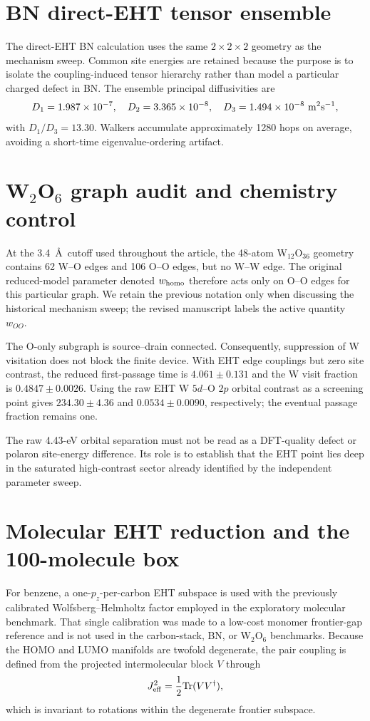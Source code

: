 \documentclass[aps,prmaterials,onecolumn,amsmath,amssymb,superscriptaddress]{revtex4-2}
\begin{document}
\section{BN direct-EHT tensor ensemble}
The direct-EHT BN calculation uses the same $2\times2\times2$ geometry as the mechanism sweep. Common site energies are retained because the purpose is to isolate the coupling-induced tensor hierarchy rather than model a particular charged defect in BN. The ensemble principal diffusivities are
\begin{equation}
D_1=1.987\times10^{-7},\quad D_2=3.365\times10^{-8},\quad D_3=1.494\times10^{-8}\ {\rm m^2s^{-1}},
\end{equation}
with $D_1/D_3=13.30$. Walkers accumulate approximately 1280 hops on average, avoiding a short-time eigenvalue-ordering artifact.

\section{W$_2$O$_6$ graph audit and chemistry control}
At the 3.4~\AA\ cutoff used throughout the article, the 48-atom W$_{12}$O$_{36}$ geometry contains 62 W--O edges and 106 O--O edges, but no W--W edge. The original reduced-model parameter denoted $w_{\rm homo}$ therefore acts only on O--O edges for this particular graph. We retain the previous notation only when discussing the historical mechanism sweep; the revised manuscript labels the active quantity $w_{OO}$.

The O-only subgraph is source--drain connected. Consequently, suppression of W visitation does not block the finite device. With EHT edge couplings but zero site contrast, the reduced first-passage time is $4.061\pm0.131$ and the W visit fraction is $0.4847\pm0.0026$. Using the raw EHT W $5d$--O $2p$ orbital contrast as a screening point gives $234.30\pm4.36$ and $0.0534\pm0.0090$, respectively; the eventual passage fraction remains one.

The raw 4.43-eV orbital separation must not be read as a DFT-quality defect or polaron site-energy difference. Its role is to establish that the EHT point lies deep in the saturated high-contrast sector already identified by the independent parameter sweep.

\section{Molecular EHT reduction and the 100-molecule box}
For benzene, a one-$p_z$-per-carbon EHT subspace is used with the previously calibrated Wolfsberg--Helmholtz factor employed in the exploratory molecular benchmark. That single calibration was made to a low-cost monomer frontier-gap reference and is not used in the carbon-stack, BN, or W$_2$O$_6$ benchmarks. Because the HOMO and LUMO manifolds are twofold degenerate, the pair coupling is defined from the projected intermolecular block $V$ through
\begin{equation}
J_{\rm eff}^2=\frac{1}{2}{\rm Tr}(VV^\dagger),
\end{equation}
which is invariant to rotations within the degenerate frontier subspace.
\end{document}
